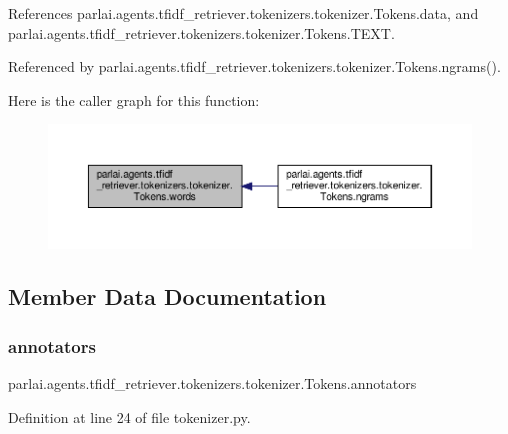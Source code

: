 References parlai.\+agents.\+tfidf\+\_\+retriever.\+tokenizers.\+tokenizer.\+Tokens.\+data, and parlai.\+agents.\+tfidf\+\_\+retriever.\+tokenizers.\+tokenizer.\+Tokens.\+T\+E\+XT.



Referenced by parlai.\+agents.\+tfidf\+\_\+retriever.\+tokenizers.\+tokenizer.\+Tokens.\+ngrams().

Here is the caller graph for this function\+:
\nopagebreak
\begin{figure}[H]
\begin{center}
\leavevmode
\includegraphics[width=350pt]{classparlai_1_1agents_1_1tfidf__retriever_1_1tokenizers_1_1tokenizer_1_1Tokens_a81b6d47a051c87c7f885a6f7db5ac891_icgraph}
\end{center}
\end{figure}


\subsection{Member Data Documentation}
\mbox{\label{classparlai_1_1agents_1_1tfidf__retriever_1_1tokenizers_1_1tokenizer_1_1Tokens_a394834203475385444a933440dcdd026}} 
\subsubsection{\texorpdfstring{annotators}{annotators}}
{\footnotesize\ttfamily parlai.\+agents.\+tfidf\+\_\+retriever.\+tokenizers.\+tokenizer.\+Tokens.\+annotators}



Definition at line 24 of file tokenizer.\+py.



